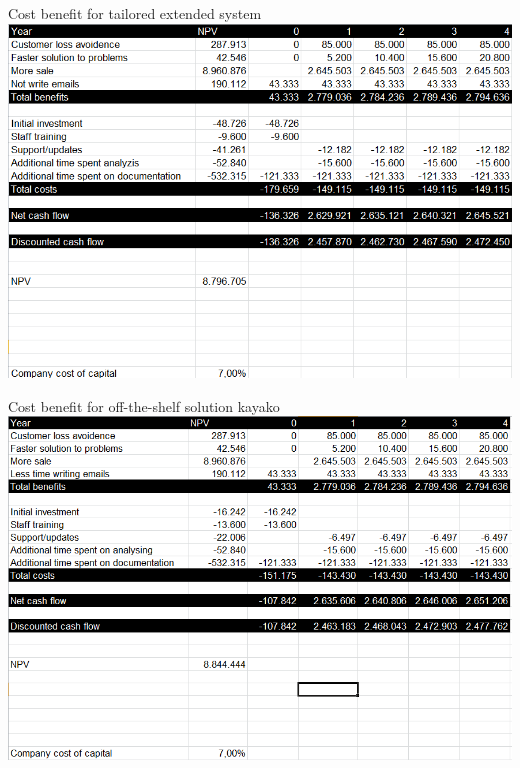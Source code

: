 \begin{thebibliography}{9}
	Cost benefit for tailored extended system\\
	\includegraphics[scale=0.6]{img/CostBenefit_TailoredExtended}

	Cost benefit for off-the-shelf solution kayako\\
	\includegraphics[scale=0.6]{img/CostBenefit_Off-the-shelf}

\end{thebibliography}